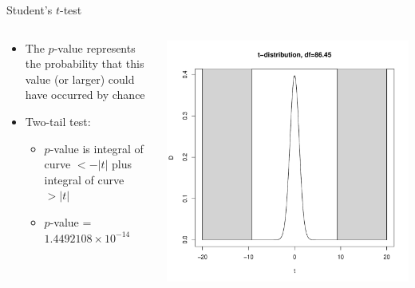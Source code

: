 \documentclass[aspectratio=169]{beamer}\usepackage[]{graphicx}\usepackage[]{color}
\makeatletter
\def\maxwidth{ %
  \ifdim\Gin@nat@width>\linewidth
    \linewidth
  \else
    \Gin@nat@width
  \fi
}
\newenvironment{knitrout}{}{} %
\makeatother
\begin{document}
\begin{frame}[fragile]{Student's $t$-test}
\begin{columns}
  \begin{column}{0.5\textwidth}
  \begin{itemize}
    \item The $p$-value represents the probability that this value (or larger) could have occurred by chance
    \item Two-tail test:
    \begin{itemize}
      \item $p$-value is integral of curve $< -|t|$ plus integral of curve $> |t|$
      \item $p$-value = \ensuremath{1.4492108\times 10^{-14}}
    \end{itemize}
  \end{itemize}
  \end{column}
  \begin{column}{0.5\textwidth}
\begin{knitrout}\scriptsize
{}\color{fgcolor}
\includegraphics[width=\maxwidth]{figure/unnamed-chunk-27-1} 

\end{knitrout}
  \end{column}
\end{columns}
\end{frame}
\end{document}

